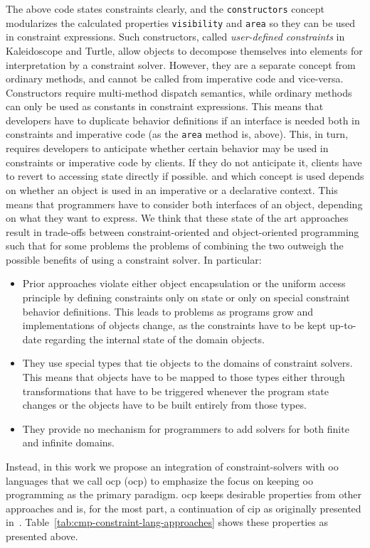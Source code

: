 The above code states constraints clearly, and the
\lstinline!constructors! concept modularizes the calculated properties
\lstinline!visibility! and \lstinline!area! so they can be used in
constraint expressions. Such constructors, called \emph{user-defined
  constraints} in Kaleidoscope and Turtle, allow objects to decompose
themselves into elements for interpretation by a constraint
solver. However, they are a separate concept from ordinary methods,
and cannot be called from imperative code and vice-versa. Constructors
require multi-method dispatch semantics, while ordinary methods can
only be used as constants in constraint expressions. This means that
developers have to duplicate behavior definitions if an interface is
needed both in constraints and imperative code (as the
\lstinline{area} method is, above). This, in turn, requires developers
to anticipate whether certain behavior may be used in constraints or
imperative code by clients. If they do not anticipate it, clients have
to revert to accessing state directly if possible.  and which concept
is used depends on whether an object is used in an imperative or a
declarative context. This means that programmers have to consider both
interfaces of an object, depending on what they want to express.
\ParSep
We think that these state of the art approaches result in trade-offs
between constraint-oriented and object-oriented programming such that
for some problems the problems of combining the two outweigh the
possible benefits of using a constraint solver. In particular:
\begin{itemize}
\item Prior approaches violate either object encapsulation or the
  uniform access principle by defining constraints only on
  state or only on special constraint behavior
  definitions. This leads to problems as programs grow and
  implementations of objects change, as the constraints have to be
  kept up-to-date regarding the internal state of the domain objects.
\item They use special types that tie objects to the domains of
  constraint solvers. This means that objects have to be mapped to
  those types either through transformations that have to be triggered
  whenever the program state changes or the objects have to be built
  entirely from those types.
\item They provide no mechanism for programmers to add solvers for
  both finite and infinite domains.
\end{itemize}

Instead, in this work we propose an integration of constraint-solvers with
\ac{oo} languages that we call \acrlong{ocp} (\acrshort{ocp}) to emphasize the
focus on keeping \ac{oo} programming as the primary paradigm. \ac{ocp} keeps
desirable properties from other approaches and is, for the most part, a
continuation of \ac{cip} as originally presented
in~\cite{freeman-benson-oopsla-1990}. Table~\ref{tab:cmp-constraint-lang-approaches}
shows these properties as presented above.

